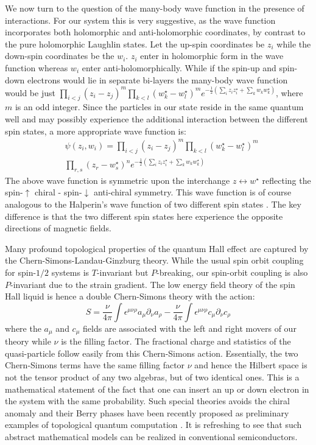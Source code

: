 \documentclass[prl,aps,amssymb,shownopacs,twocolumn]{revtex4}
\begin{document}
	We now turn to the question of the many-body wave function in the
	presence of interactions. For our system this is very suggestive, as
	the wave function incorporates both holomorphic and anti-holomorphic
	coordinates, by contrast to the pure holomorphic Laughlin states.
	Let the up-spin coordinates be $z_i$ while the down-spin coordinates
	be the $w_i$. $z_i$ enter in holomorphic form in the wave function
	whereas $w_i$ enter anti-holomorphically. While if the spin-up and
	spin-down electrons would lie in separate bi-layers the many-body
	wave function would be just $\prod_{i<j} (z_i -z_j)^m \prod_{k<l}
	(w^\star_k - w^\star_l)^m e^{-\frac{1}{2} (\sum_{i}z_i z_i^\star +
		\sum_k w_k w_k^\star)}$, where $m$ is an odd integer. Since the
	particles in our state reside in the same quantum well and may
	possibly experience the additional interaction between the different
	spin states, a more appropriate wave function is:
	\begin{eqnarray}
		& \psi(z_i, w_i) = \prod_{i<j} (z_i -z_j)^m \prod_{k<l} (w^\star_k
		- w^\star_l)^m \nonumber \\ & \prod_{r,s} (z_r -w^\star_s)^n
		e^{-\frac{1}{2} (\sum_{i} z_i z_i^\star + \sum_k w_k w_k^\star)}
	\end{eqnarray}
	\noindent The above wave function is symmetric upon the interchange
	$z \leftrightarrow w^\star$ reflecting the spin-$\uparrow$ chiral -
	spin-$\downarrow$ anti-chiral symmetry. This wave function is of
	course analogous to the Halperin's wave function of two different
	spin states \cite{halperin1983}. The key difference is that the two
	different spin states here experience the opposite directions of
	magnetic fields.
	
	Many profound topological properties of the quantum Hall effect
	are captured by the Chern-Simons-Landau-Ginzburg
	theory\cite{zhang1989}. While the usual spin orbit coupling for
	spin-$1/2$ systems is $T$-invariant but $P$-breaking, our
	spin-orbit coupling is also $P$-invariant due to the strain
	gradient. The low energy field theory of the spin Hall liquid is
	hence a double Chern-Simons theory with the action:
	\begin{equation}
		S = \frac{\nu}{4 \pi} \int \epsilon^{\mu \nu \rho} a_\mu
		\partial_\nu a_\rho - \frac{\nu}{4 \pi} \int \epsilon^{\mu \nu \rho}
		c_\mu \partial_\nu c_\rho
	\end{equation}
	\noindent where the $a_\mu$ and $c_\mu$ fields are associated with
	the left and right movers of our theory while $\nu$ is the filling
	factor. The fractional charge and statistics of the quasi-particle
	follow easily from this Chern-Simons action. Essentially, the two
	Chern-Simons terms have the same filling factor $\nu$ and hence
	the Hilbert space is not the tensor product of any two algebras,
	but of two identical ones. This is a mathematical statement of the
	fact that one can insert an up or down electron in the system with
	the same probability. Such special theories avoids the chiral
	anomaly \cite{freedman2003} and their Berry phases have been
	recently proposed as preliminary examples of topological quantum
	computation \cite{freedman2003}. It is refreshing to see that such
	abstract mathematical models can be realized in conventional
	semiconductors.
	
\end{document}
